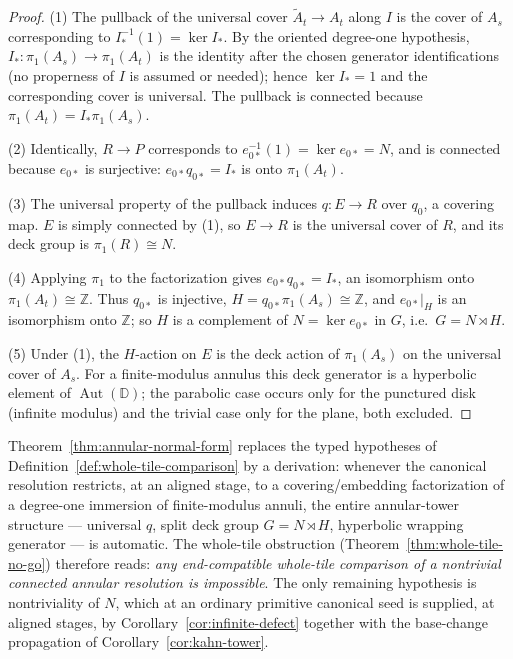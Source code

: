\begin{proof}
(1) The pullback of the universal cover $\widetilde A_t\to A_t$ along
$I$ is the cover of $A_s$ corresponding to
$I_*^{-1}(1)=\ker I_*$.  By the oriented degree-one hypothesis,
$I_*\colon\pi_1(A_s)\to\pi_1(A_t)$ is the identity after the chosen
generator identifications (no properness of $I$ is assumed or needed);
hence $\ker I_*=1$ and the corresponding cover is universal.  The
pullback is connected because $\pi_1(A_t)=I_*\pi_1(A_s)$.

(2) Identically, $R\to P$ corresponds to
$e_{0*}^{-1}(1)=\ker e_{0*}=N$, and is connected because
$e_{0*}$ is surjective: $e_{0*}q_{0*}=I_*$ is onto $\pi_1(A_t)$.

(3) The universal property of the pullback induces
$q\colon E\to R$ over $q_0$, a covering map.  $E$ is simply connected
by (1), so $E\to R$ is the universal cover of $R$, and its deck group
is $\pi_1(R)\cong N$.

(4) Applying $\pi_1$ to the factorization gives
$e_{0*}q_{0*}=I_*$, an isomorphism onto
$\pi_1(A_t)\cong\mathbb Z$.  Thus $q_{0*}$ is injective,
$H=q_{0*}\pi_1(A_s)\cong\mathbb Z$, and $e_{0*}|_H$ is an isomorphism
onto $\mathbb Z$; so $H$ is a complement of $N=\ker e_{0*}$ in $G$,
i.e.\ $G=N\rtimes H$.

(5) Under (1), the $H$-action on $E$ is the deck action of
$\pi_1(A_s)$ on the universal cover of $A_s$.  For a finite-modulus
annulus this deck generator is a hyperbolic element of
$\operatorname{Aut}(\mathbb D)$; the parabolic case occurs only for
the punctured disk (infinite modulus) and the trivial case only for
the plane, both excluded.
\end{proof}

\begin{remark}
\label{rem:typing-derived}
Theorem~\ref{thm:annular-normal-form} replaces the typed hypotheses of
Definition~\ref{def:whole-tile-comparison} by a derivation: whenever
the canonical resolution restricts, at an aligned stage, to a
covering/embedding factorization of a degree-one immersion of
finite-modulus annuli, the entire annular-tower structure --- universal
$q$, split deck group $G=N\rtimes H$, hyperbolic wrapping generator ---
is automatic.  The whole-tile obstruction
(Theorem~\ref{thm:whole-tile-no-go}) therefore reads: \emph{any
end-compatible whole-tile comparison of a nontrivial connected annular
resolution is impossible}.  The only remaining hypothesis is
nontriviality of $N$, which at an ordinary primitive canonical seed is
supplied, at aligned stages, by
Corollary~\ref{cor:infinite-defect} together with the base-change
propagation of Corollary~\ref{cor:kahn-tower}.
\end{remark}
